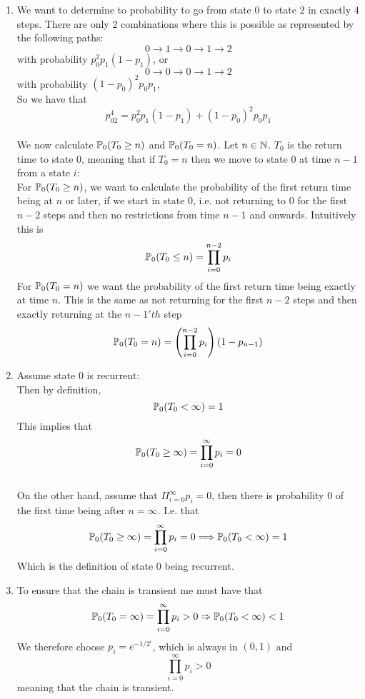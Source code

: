 \documentclass{Class}
\begin{document}
\begin{enumerate}
\begin{center}
    \end{center}
    \item We want to determine to probability to go from state $0$ to state $2$ in exactly $4$ steps. There are only 2 combinations where this is possible as represented by the following paths:
    $$0\rightarrow 1\rightarrow  0 \rightarrow 1\rightarrow 2
    $$ with probability $p_0^2p_1(1-p_1)$, or
    $$0\rightarrow 0\rightarrow  0 \rightarrow 1\rightarrow 2$$
    with probability $(1-p_0)^2p_0p_1$, \\So we have that $$p_{02}^4=p_0^2p_1(1-p_1)+(1-p_0)^2p_0p_1$$
\\We now calculate $\mathbb{P}_0(T_0\geq n)$ and $\mathbb{P}_0(T_0=n)$. Let $n\in\mathbb{N}$. $T_0$ is the return time to state 0, meaning that if $T_0=n$ then we move to state 0 at time $n-1$ from a state $i$:
    \\For $\mathbb{P}_0(T_0\geq n)$, we want to calculate the probability of the first return time being at $n$ or later, if we start in state 0, i.e. not returning to 0 for the first $n-2$ steps and then no restrictions from time $n-1$ and onwards. Intuitively this is 
    $$\mathbb{P}_0(T_0\leq n)=\prod_{i=0}^{n-2}p_i$$
    For $\mathbb{P}_0(T_0= n)$ we want the probability of the first return time being exactly at time $n$. This is the same as not returning for the first $n-2$ steps and then exactly returning at the $n-1'th$ step
    $$\mathbb{P}_0(T_0=n)=\left(\prod_{i=0}^{n-2}p_i\right)(1-p_{n-1})$$
    \item Assume state 0 is recurrent:
    \\Then by definition, $$\mathbb{P}_0(T_0<\infty)=1$$ This implies that $$\mathbb{P}_0(T_0\geq \infty)=\prod_{i=0}^{\infty}p_i = 0$$
    \\On the other hand, assume that $\Pi_{i=0}^{\infty}p_i=0$, then there is probability 0 of the first time being after $n=\infty$.
    I.e. that 
    $$\mathbb{P}_0(T_0\geq \infty)=\prod_{i=0}^{\infty}p_i=0\Longrightarrow \mathbb{P}_0(T_0<\infty) = 1$$ Which is the definition of state 0 being recurrent.
    \item To ensure that the chain is transient me must have that $$\mathbb{P}_0(T_0=\infty)=\prod_{i=0}^{\infty}p_i>0\Rightarrow \mathbb{P}_0(T_0<\infty)<1$$
    We therefore choose $p_i=e^{-1/2^i}$, which is always in $(0,1)$ and $$\prod_{i=0}^{\infty}p_i>0$$ meaning that the chain is transient.

\end{enumerate}
\end{document}
